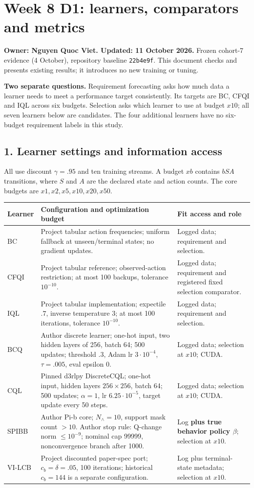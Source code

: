 \documentclass[10pt,a4paper]{article}
\begin{document}
\section*{Week 8 D1: learners, comparators and metrics}
\textbf{Owner: Nguyen Quoc Viet. Updated: 11 October 2026.}
Frozen cohort-7 evidence (4 October), repository baseline \texttt{22b4e9f}.
This document checks and presents existing results; it introduces no new training or tuning.

\textbf{Two separate questions.} Requirement forecasting asks how much data a learner needs to meet a performance target consistently. Its targets are BC, CFQI and IQL across six budgets. Selection asks which learner to use at budget $x10$; all seven learners below are candidates. The four additional learners have no six-budget requirement labels in this study.

\subsection*{1. Learner settings and information access}
All use discount $\gamma=.95$ and ten training streams. A budget $xb$ contains $bSA$ transitions, where $S$ and $A$ are the declared state and action counts. The core budgets are $x1,x2,x5,x10,x20,x50$.

{\small
\begin{tabular}{@{}p{}p{}p{}@{}}\hline
\textbf{Learner} & \textbf{Configuration and optimization budget} & \textbf{Fit access and role}\\\hline
BC & Project tabular action frequencies; uniform fallback at unseen/terminal states; no gradient updates. & Logged data; requirement and selection.\\
CFQI & Project tabular reference; observed-action restriction; at most 100 backups, tolerance $10^{-10}$. & Logged data; requirement and registered fixed selection comparator.\\
IQL & Project tabular implementation; expectile $.7$, inverse temperature $3$; at most 100 iterations, tolerance $10^{-10}$. & Logged data; requirement and selection.\\
BCQ & Author discrete learner; one-hot input, two hidden layers of 256, batch 64; 500 updates; threshold $.3$, Adam lr $3\cdot10^{-4}$, $\tau=.005$, eval epsilon $0$. & Logged data; selection at $x10$; CUDA.\\
CQL & Pinned d3rlpy DiscreteCQL; one-hot input, hidden layers $256\times256$, batch 64; 500 updates; $\alpha=1$, lr $6.25\cdot10^{-5}$, target update every 50 steps. & Logged data; selection at $x10$; CUDA.\\
SPIBB & Author Pi-b core; $N_{\wedge}=10$, support mask count $>10$. Author stop rule: Q-change norm $\le10^{-9}$; nominal cap 99999, nonconvergence branch after 1000. & Log \textbf{plus true behavior policy $\beta$}; selection at $x10$.\\
VI-LCB & Project discounted paper-spec port; $c_b=\delta=.05$, 100 iterations; historical $c_b=144$ is a separate configuration. & Log plus terminal-state metadata; selection at $x10$.\\\hline
\end{tabular}}
\end{document}
